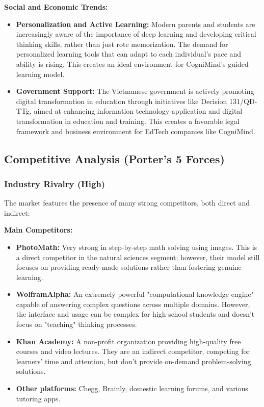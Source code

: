 \textbf{Social and Economic Trends:}
\begin{itemize}
    \item \textbf{Personalization and Active Learning:}
        Modern parents and students are increasingly aware of the importance of deep learning and developing critical
        thinking skills, rather than just rote memorization. The demand for personalized learning tools that can adapt
        to each individual's pace and ability is rising. This creates an ideal environment for CogniMind's guided 
        learning model.
    \item \textbf{Government Support:}
        The Vietnamese government is actively promoting digital transformation in education through initiatives like 
        Decision 131/QĐ-TTg, aimed at enhancing information technology application and digital transformation in 
        education and training. This creates a favorable legal framework and business environment for EdTech companies 
        like CogniMind.
\end{itemize}

\subsection{Competitive Analysis (Porter's 5 Forces)}
\subsubsection{Industry Rivalry (High)}
The market features the presence of many strong competitors, both direct and indirect:

\textbf{Main Competitors:}
\begin{itemize}
    \item \textbf{PhotoMath:}
        Very strong in step-by-step math solving using images. This is a direct competitor in the natural sciences
        segment; however, their model still focuses on providing ready-made solutions rather than fostering genuine
        learning.
    \item \textbf{WolframAlpha:} 
        An extremely powerful "computational knowledge engine" capable of answering complex questions across multiple 
        domains. However, the interface and usage can be complex for high school students and doesn't focus on 
        "teaching" thinking processes.
    \item \textbf{Khan Academy:} 
        A non-profit organization providing high-quality free courses and video lectures. They are an indirect competitor, 
        competing for learners' time and attention, but don't provide on-demand problem-solving solutions.
    \item \textbf{Other platforms:} 
        Chegg, Brainly, domestic learning forums, and various tutoring apps.
\end{itemize}

